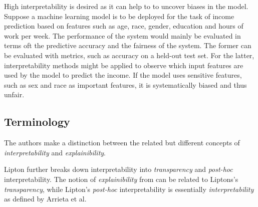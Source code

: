 

High interpretability is desired as it can help to to uncover biases in the model. Suppose a machine learning model is to be deployed for the task of income prediction based on features such as age, race, gender, education and hours of work per week. The performance of the system would mainly be evaluated in terms oft the predictive accuracy and the fairness of the system. The former can be evaluated with metrics, such as accuracy on a held-out test set. For the latter, interpretability methods might be applied to observe which input features are used by the model to predict the income. 
If the model uses sensitive features, such as sex and race as important features, it is systematically biased and thus unfair. 


\subsection{Terminology}
\label{subsec:interpretation_methods_terminology}

The authors make a distinction between the related but different concepts of \textit{interpretability} and \textit{explainibility}. 

Lipton \cite{lipton2018mythos} further breaks down interpretability into \textit{transparency} and \textit{post-hoc} interpretability. The notion of \textit{explainibility} from \cite{arrieta2020explainable} can be related to Liptons's \textit{transparency}, while Lipton's \textit{post-hoc} interpretability is essentially \textit{interpretability} as defined by Arrieta et al. 


